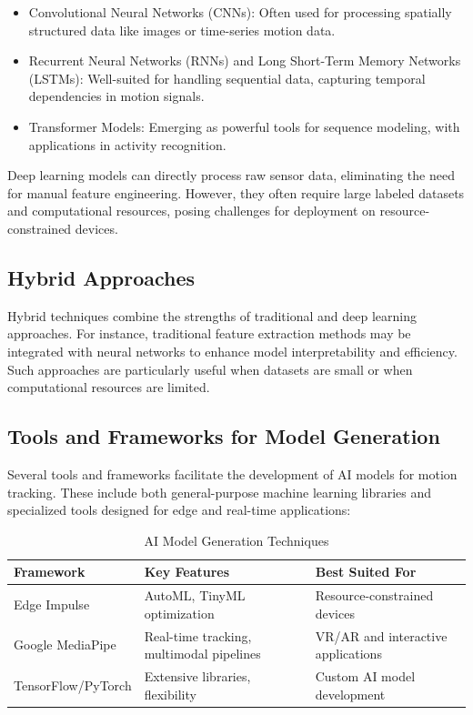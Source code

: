\begin{itemize}
    \item Convolutional Neural Networks (CNNs): Often used for processing spatially structured data like images or time-series motion data.
    \item Recurrent Neural Networks (RNNs) and Long Short-Term Memory Networks (LSTMs): Well-suited for handling sequential data, capturing temporal dependencies in motion signals.
    \item Transformer Models: Emerging as powerful tools for sequence modeling, with applications in activity recognition.
\end{itemize}
Deep learning models can directly process raw sensor data, eliminating the need for manual feature engineering. However, they often require large labeled datasets and computational resources, posing challenges for deployment on resource-constrained devices.

\subsection{Hybrid Approaches}
Hybrid techniques combine the strengths of traditional and deep learning approaches. For instance, traditional feature extraction methods may be integrated with neural networks to enhance model interpretability and efficiency. Such approaches are particularly useful when datasets are small or when computational resources are limited.

\subsection{Tools and Frameworks for Model Generation}
Several tools and frameworks facilitate the development of AI models for motion tracking. These include both general-purpose machine learning libraries and specialized tools designed for edge and real-time applications:

\begin{table}[htb]
\centering
\caption{AI Model Generation Techniques}
\label{tab:tab_2}
\begin{tabular}{ |>{\centering\arraybackslash}m{3.5cm}|>{\centering\arraybackslash}m{5cm}|>{\centering\arraybackslash}m{5cm}| } 
\toprule
\textbf{Framework} &	\textbf{Key Features} &	\textbf{Best Suited For} \\
\midrule
Edge Impulse &	AutoML, TinyML optimization &	Resource-constrained devices \\
\hline
Google MediaPipe &	Real-time tracking, multimodal pipelines &	VR/AR and interactive applications \\
\hline
TensorFlow/PyTorch &	Extensive libraries, flexibility &	Custom AI model development \\
\bottomrule
\end{tabular}
\end{table}

